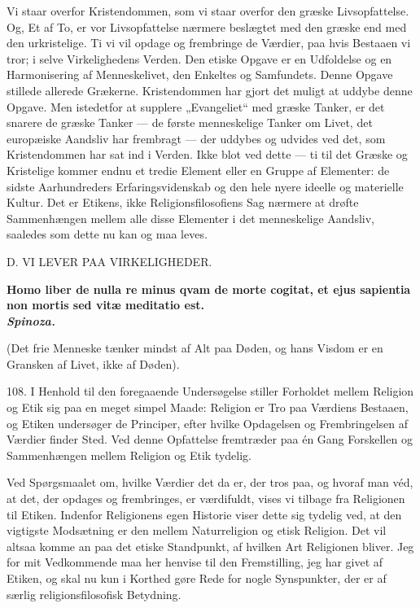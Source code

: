 \documentclass[12pt,a4paper,openany]{book}
\newcommand{\opage}[1]{\marginnote{\footnotesize\textit{[#1]}}}
\begin{document}
Vi staar overfor Kristendommen, som vi staar overfor den græske
Livsopfattelse. Og, Et af To, er vor Livsopfattelse nærmere beslægtet
med den græske end med den urkristelige. Ti vi vil opdage og frembringe
de Værdier, paa hvis Bestaaen vi tror; i selve Virkelighedens Verden.
Den etiske Opgave er en Udfoldelse og en Harmonisering af Menneskelivet,
den Enkeltes og Samfundets. Denne Opgave stillede allerede Grækerne.
Kristendommen har gjort det muligt at uddybe denne Opgave. Men
istedetfor at supplere „Evangeliet“ med græske Tanker, er det snarere de
græske Tanker --- de første menneskelige Tanker om Livet, det europæiske
Aandsliv har frembragt --- der uddybes og udvides ved det, som
Kristendommen har sat ind i Verden. Ikke blot ved dette --- ti til det
Græske og Kristelige kommer endnu et tredie Element eller en Gruppe af
Elementer: de sidste Aarhundreders Erfaringsvidenskab og den hele nyere
ideelle og materielle Kultur. Det er Etikens, ikke Religionsfilosofiens
Sag nærmere at drøfte Sammenhængen mellem alle disse Elementer i det
menneskelige Aandsliv, saaledes som dette nu kan og maa leves.

\clearpage

\opage{238}\begin{center}D. VI LEVER PAA VIRKELIGHEDER.\end{center}

\begin{flushright}\begin{minipage}{0.55\textwidth}\small\bfseries
Homo liber de nulla re minus qvam de morte cogitat, et ejus sapientia
non mortis sed vitæ meditatio est.\\
\hfill\textit{Spinoza.}\par\smallskip
(Det frie Menneske tænker mindst af Alt paa Døden, og hans Visdom er en
Gransken af Livet, ikke af Døden).
\end{minipage}\end{flushright}

108. I Henhold til den foregaaende Undersøgelse stiller Forholdet mellem
Religion og Etik sig paa en meget simpel Maade: Religion er Tro paa
Værdiens Bestaaen, og Etiken undersøger de Principer, efter hvilke
Opdagelsen og Frembringelsen af Værdier finder Sted. Ved denne
Opfattelse fremtræder paa én Gang Forskellen og Sammenhængen mellem
Religion og Etik tydelig.

Ved Spørgsmaalet om, hvilke Værdier det da er, der tros paa, og hvoraf
man véd, at det, der opdages og frembringes, er værdifuldt, vises vi
tilbage fra Religionen til Etiken. Indenfor Religionens egen Historie
viser dette sig tydelig ved, at den vigtigste Modsætning er den mellem
Naturreligion og etisk Religion. Det vil altsaa komme an paa det etiske
Standpunkt, af hvilken Art Religionen bliver. Jeg for mit Vedkommende
maa her henvise til den Fremstilling, jeg har givet af Etiken, og skal
nu kun i Korthed gøre Rede for nogle Synspunkter, der er af særlig
religionsfilosofisk Betydning.
\end{document}
